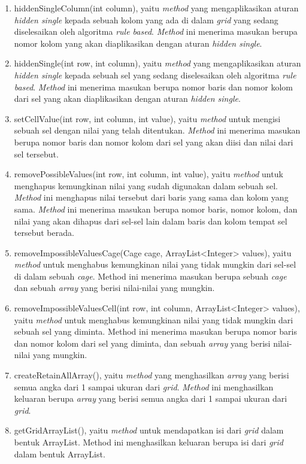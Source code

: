 \begin{enumerate}
\item hiddenSingleColumn(int column), yaitu \textit{method} yang mengaplikasikan aturan \textit{hidden single} kepada sebuah kolom yang ada di dalam \textit{grid} yang sedang diselesaikan oleh algoritma \textit{rule based}. \textit{Method} ini menerima masukan berupa nomor kolom yang akan diaplikasikan dengan aturan \textit{hidden single}.
\item hiddenSingle(int row, int column), yaitu \textit{method} yang mengaplikasikan aturan \textit{hidden single} kepada sebuah sel yang sedang diselesaikan oleh algoritma \textit{rule based}. \textit{Method} ini menerima masukan berupa nomor baris dan nomor kolom dari sel yang akan diaplikasikan dengan aturan \textit{hidden single}.
\item setCellValue(int row, int column, int value), yaitu \textit{method} untuk mengisi sebuah sel dengan nilai yang telah ditentukan. \textit{Method} ini menerima masukan berupa nomor baris dan nomor kolom dari sel yang akan diisi dan nilai dari sel tersebut.
\item removePossibleValues(int row, int column, int value), yaitu \textit{method} untuk menghapus kemungkinan nilai yang sudah digunakan dalam sebuah sel. \textit{Method} ini menghapus nilai tersebut dari baris yang sama dan kolom yang sama. \textit{Method} ini menerima masukan berupa nomor baris, nomor kolom, dan nilai yang akan dihapus dari sel-sel lain dalam baris dan kolom tempat sel tersebut berada.
\item removeImpossibleValuesCage(Cage cage, ArrayList<Integer> values), yaitu \textit{method} untuk menghabus kemungkinan nilai yang tidak mungkin dari sel-sel di dalam sebuah \textit{cage}. Method ini menerima masukan berupa sebuah \textit{cage} dan sebuah \textit{array} yang berisi nilai-nilai yang mungkin.
\item removeImpossibleValuesCell(int row, int column, ArrayList<Integer> values), yaitu \textit{method} untuk menghabus kemungkinan nilai yang tidak mungkin dari sebuah sel yang diminta. Method ini menerima masukan berupa nomor baris dan nomor kolom dari sel yang diminta, dan sebuah \textit{array} yang berisi nilai-nilai yang mungkin.
\item createRetainAllArray(), yaitu \textit{method} yang menghasilkan \textit{array} yang berisi semua angka dari 1 sampai ukuran dari \textit{grid}. \textit{Method} ini menghasilkan keluaran berupa \textit{array} yang berisi semua angka dari 1 sampai ukuran dari \textit{grid}.
\item getGridArrayList(), yaitu \textit{method} untuk mendapatkan isi dari \textit{grid} dalam bentuk ArrayList. Method ini menghasilkan keluaran berupa isi dari \textit{grid} dalam bentuk ArrayList.

\end{enumerate}
